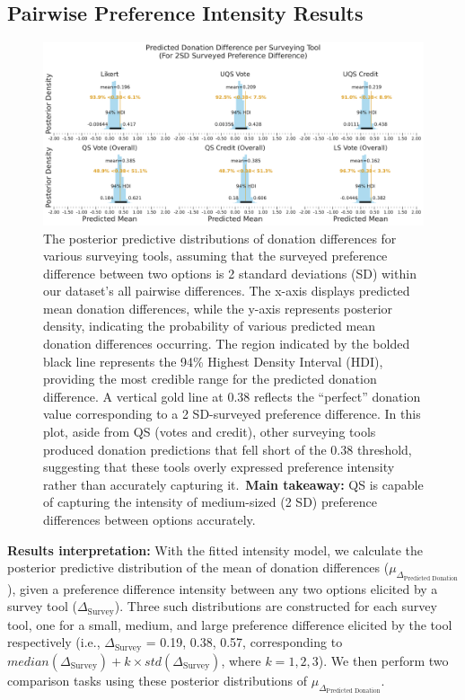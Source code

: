 \subsection{Pairwise Preference Intensity Results}
\label{sec:result_2}

\begin{figure}[h]
    \centering
    \includegraphics[width=\textwidth]{content/image/intensity_2sd.pdf}
    \caption{
    The posterior predictive distributions of donation differences for various surveying tools, assuming that the surveyed preference difference between two options is 2 standard deviations (SD) within our dataset's all pairwise differences. The x-axis displays predicted mean donation differences, while the y-axis represents posterior density, indicating the probability of various predicted mean donation differences occurring. The region indicated by the bolded black line represents the 94\% Highest Density Interval (HDI), providing the most credible range for the predicted donation difference. A vertical gold line at 0.38 reflects the ``perfect'' donation value corresponding to a 2 SD-surveyed preference difference. In this plot, aside from QS (votes and credit), other surveying tools produced donation predictions that fell short of the 0.38 threshold, suggesting that these tools overly expressed preference intensity rather than accurately capturing it.~\textbf{Main takeaway:} QS is capable of capturing the intensity of medium-sized (2 SD) preference differences between options accurately.
    }
    \label{fig:donation_posterior}
\end{figure}


\textbf{Results interpretation:} With the fitted intensity model, we calculate the posterior predictive distribution of the mean of donation differences ($\mu_{\Delta_{\text{Predicted Donation}}}$), given a preference difference intensity between any two options elicited by a survey tool ($\Delta_{\text{Survey}}$). Three such distributions are constructed for each survey tool, one for a small, medium, and large preference difference elicited by the tool respectively (i.e., $\Delta_{\text{Survey}}$ = 0.19, 0.38, 0.57, corresponding to $median(\Delta_{\text{Survey}})+k \times std(\Delta_{\text{Survey}})$, where $k=1, 2, 3$). We then perform two comparison tasks using these posterior distributions of $\mu_{\Delta_{\text{Predicted Donation}}}$. 

